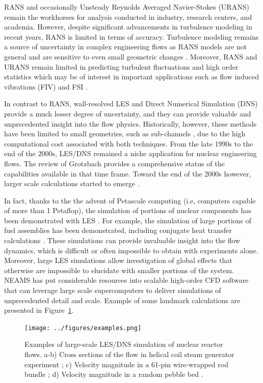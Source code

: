 RANS \cite{conner2010cfd} and occasionally Unsteady Reynolds Averaged
Navier-Stokes (URANS) remain the workhorses for analysis conducted in industry,
research centers, and academia.  However, despite significant advancements in
turbulence modeling in recent years, RANS is limited in terms of accuracy.
Turbulence modeling remains a source of uncertainty in complex engineering
flows as RANS models are not general and are sensitive to even small geometric
changes \cite{merzari2010numerical}. Moreover, RANS and URANS remain limited in
predicting turbulent fluctuations and high order statistics which may be of
interest in important applications such as flow induced vibrations (FIV) and
FSI \cite{yuan2017flow}.

In contrast to RANS, wall-resolved LES and Direct Numerical Simulation (DNS)
provide a much lesser degree of uncertainty, and they can provide valuable and
unprecedented insight into the flow physics. Historically, however, these
methods have been limited to small geometries, such as sub-channels
\cite{grotzbach1999direct}, due to the high computational cost associated with
both techniques. From the late 1990s to the end of the 2000s, LES/DNS remained
a niche application for nuclear engineering flows. The review of Grotzbach
\cite{grotzbach1999direct} provides a comprehensive status of the capabilities
available in that time frame. Toward the end of the 2000s however, larger scale
calculations started to emerge \cite{pointer2009simulations}.

In fact, thanks to the the advent of Petascale computing (i.e, computers
capable of more than 1 Petaflop), the simulation of portions of nuclear
components has been demonstrated with LES \cite{merzari2017large}. For example,
the simulation of large portions of fuel assemblies has been demonstrated,
including conjugate heat transfer calculations \cite{obabko2019}. These
simulations can provide invaluable insight into the flow dynamics, which is
difficult or often impossible to obtain with experiments alone. Moreover, large
LES simulations allow investigation of global effects that otherwise are
impossible to elucidate with smaller portions of the system. NEAMS has put
considerable resources into scalable high-order CFD software that can leverage
large scale supercomputers to deliver simulations of unprecedented detail and
scale. Example of some landmark calculations are presented in
Figure~\ref{f:examples}.

\begin{figure}[!ht]
\centering
\texttt{[image: ../figures/examples.png]}
\caption{Examples of large-scale LES/DNS simulation of nuclear reactor flows.
a-b) Cross sections of the flow in helical coil steam generator experiment
\cite{alper2018}; c) Velocity magnitude in a 61-pin wire-wrapped rod bundle
\cite{goth2018comparison}; d) Velocity magnitude in a random pebble bed
\cite{yuan2019}.} \label{f:examples}
\end{figure}

